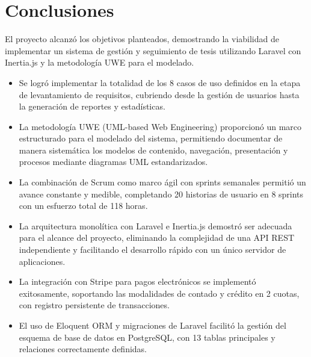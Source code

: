 \section{Conclusiones}
\label{sec:conclusiones}

El proyecto alcanzó los objetivos planteados, demostrando la viabilidad de implementar un sistema de gestión y seguimiento de tesis utilizando Laravel con Inertia.js y la metodología UWE para el modelado.

\begin{itemize}
    \item Se logró implementar la totalidad de los 8 casos de uso definidos en la etapa de levantamiento de requisitos, cubriendo desde la gestión de usuarios hasta la generación de reportes y estadísticas.
    \item La metodología UWE (UML-based Web Engineering) proporcionó un marco estructurado para el modelado del sistema, permitiendo documentar de manera sistemática los modelos de contenido, navegación, presentación y procesos mediante diagramas UML estandarizados.
    \item La combinación de Scrum como marco ágil con sprints semanales permitió un avance constante y medible, completando 20 historias de usuario en 8 sprints con un esfuerzo total de 118 horas.
    \item La arquitectura monolítica con Laravel e Inertia.js demostró ser adecuada para el alcance del proyecto, eliminando la complejidad de una API REST independiente y facilitando el desarrollo rápido con un único servidor de aplicaciones.
    \item La integración con Stripe para pagos electrónicos se implementó exitosamente, soportando las modalidades de contado y crédito en 2 cuotas, con registro persistente de transacciones.
    \item El uso de Eloquent ORM y migraciones de Laravel facilitó la gestión del esquema de base de datos en PostgreSQL, con 13 tablas principales y relaciones correctamente definidas.
\end{itemize}

\endinput
